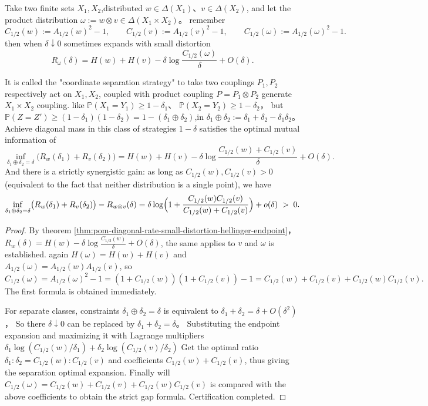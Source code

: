 \begin{theorem}\label{thm:pom-diagonal-rate-small-distortion-synergy-product}
Take two finite sets \(X_1,X_2\),distributed \(w\in\Delta(X_1)\)、\(v\in\Delta(X_2)\), and let the product distribution \(\omega:=w\otimes v\in\Delta(X_1\times X_2)\)。
remember
\[
C_{1/2}(w):=A_{1/2}(w)^2-1,\qquad C_{1/2}(v):=A_{1/2}(v)^2-1,\qquad
C_{1/2}(\omega):=A_{1/2}(\omega)^2-1.
\]
then when \(\delta\downarrow 0\) sometimes expands with small distortion
\[
R_{\omega}(\delta)=H(w)+H(v)-\delta\log\frac{C_{1/2}(\omega)}{\delta}+O(\delta).
\]
\par
It is called the "coordinate separation strategy" to take two couplings \(P_1,P_2\) respectively act on \(X_1,X_2\), coupled with product coupling \(P=P_1\otimes P_2\) generate \(X_1\times X_2\) coupling.
like
\(
\mathbb P(X_1=Y_1)\ge 1-\delta_1
\)、
\(
\mathbb P(X_2=Y_2)\ge 1-\delta_2
\)，
but
\(
\mathbb P(Z=Z')\ge (1-\delta_1)(1-\delta_2)=1-(\delta_1\oplus\delta_2)
\),in \(\delta_1\oplus\delta_2:=\delta_1+\delta_2-\delta_1\delta_2\)。
Achieve diagonal mass in this class of strategies \(1-\delta\) satisfies the optimal mutual information of
\[
\inf_{\delta_1\oplus\delta_2=\delta}\bigl(R_w(\delta_1)+R_v(\delta_2)\bigr)
=H(w)+H(v)-\delta\log\frac{C_{1/2}(w)+C_{1/2}(v)}{\delta}+O(\delta).
\]
And there is a strictly synergistic gain: as long as \(C_{1/2}(w),C_{1/2}(v)>0\) (equivalent to the fact that neither distribution is a single point), we have
\[
\inf_{\delta_1\oplus\delta_2=\delta}\bigl(R_w(\delta_1)+R_v(\delta_2)\bigr)-R_{w\otimes v}(\delta)
=\delta\log\Bigl(1+\frac{C_{1/2}(w)C_{1/2}(v)}{C_{1/2}(w)+C_{1/2}(v)}\Bigr)+o(\delta)\;>\;0.
\]
\end{theorem}
\begin{proof}
By theorem \ref{thm:pom-diagonal-rate-small-distortion-hellinger-endpoint}，
\(
R_w(\delta)=H(w)-\delta\log\frac{C_{1/2}(w)}{\delta}+O(\delta)
\), the same applies to \(v\) and \(\omega\) is established.
again \(H(\omega)=H(w)+H(v)\) and
\(
A_{1/2}(\omega)=A_{1/2}(w)A_{1/2}(v)
\), so
\[
C_{1/2}(\omega)
=A_{1/2}(\omega)^2-1
=(1+C_{1/2}(w))(1+C_{1/2}(v))-1
=C_{1/2}(w)+C_{1/2}(v)+C_{1/2}(w)C_{1/2}(v).
\]
The first formula is obtained immediately.
\par
For separate classes, constraints \(\delta_1\oplus\delta_2=\delta\) is equivalent to \(\delta_1+\delta_2=\delta+O(\delta^2)\)，
So there \(\delta\downarrow 0\) can be replaced by \(\delta_1+\delta_2=\delta\)。
Substituting the endpoint expansion and maximizing it with Lagrange multipliers
\(
\delta_1\log(C_{1/2}(w)/\delta_1)+\delta_2\log(C_{1/2}(v)/\delta_2)
\)
Get the optimal ratio \(\delta_1:\delta_2=C_{1/2}(w):C_{1/2}(v)\) and coefficients \(C_{1/2}(w)+C_{1/2}(v)\), thus giving the separation optimal expansion.
Finally will \(C_{1/2}(\omega)=C_{1/2}(w)+C_{1/2}(v)+C_{1/2}(w)C_{1/2}(v)\) is compared with the above coefficients to obtain the strict gap formula. Certification completed.
\end{proof}

